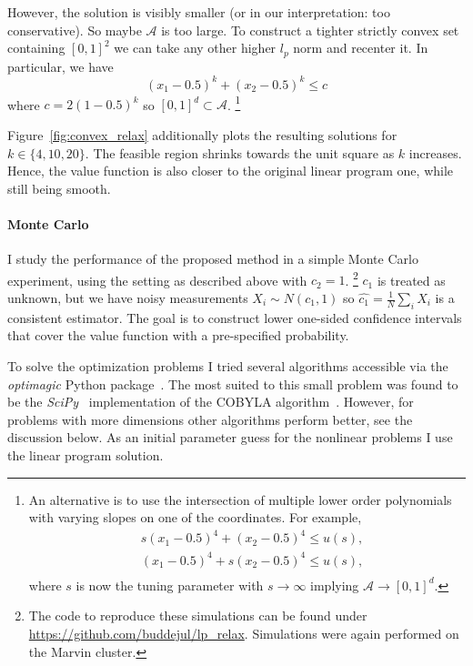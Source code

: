 \documentclass[12pt,a4paper,english]{article} %
\numberwithin{equation}{section}
\theoremstyle{definition}
\theoremstyle{remark}
\theoremstyle{plain}
\begin{document}
However, the solution is visibly smaller (or in our interpretation: too conservative).
So maybe $\mathcal{A}$ is too large.
To construct a tighter strictly convex set containing $[0,1]^2$ we can take any other higher $l_p$ norm and recenter it.
In particular, we have
\begin{equation*}
	(x_1-0.5)^k + (x_2-0.5)^k \leq c
\end{equation*}
where $c = 2(1-0.5)^k$ so $[0,1]^d \subset \mathcal{A}$.
\footnote{An alternative is to use the intersection of multiple lower order polynomials with varying slopes on one of the coordinates. For example,
\begin{align}
	& s(x_1 - 0.5)^4 + (x_2 - 0.5)^4 \leq u(s), \\
	& (x_1 - 0.5)^4 + s(x_2 - 0.5)^4 \leq u(s), \\
\end{align}
where $s$ is now the tuning parameter with $s\to\infty$ implying $\mathcal{A} \to [0,1]^d$.}

Figure~\ref{fig:convex_relax} additionally plots the resulting solutions for $k\in\{4, 10, 20\}$.
The feasible region shrinks towards the unit square as $k$ increases.
Hence, the value function is also closer to the original linear program one, while still being smooth.

\paragraph{Monte Carlo}
I study the performance of the proposed method in a simple Monte Carlo experiment, using the setting as described above with $c_2=1$.
\footnote{The code to reproduce these simulations can be found under \url{https://github.com/buddejul/lp_relax}.
Simulations were again performed on the Marvin cluster.}
$c_1$ is treated as unknown, but we have noisy measurements $X_i \sim N(c_1, 1)$ so $\hat{c_1} = \frac{1}{N}\sum_i X_i$ is a consistent estimator.
The goal is to construct lower one-sided confidence intervals that cover the value function with a pre-specified probability.

To solve the optimization problems I tried several algorithms accessible via the \textit{optimagic} Python package~\citep{Gabler2024}.
The most suited to this small problem was found to be the \textit{SciPy}~\citep{scipy} implementation of the COBYLA algorithm~\citep{cobyla_powell1994direct}.
However, for problems with more dimensions other algorithms perform better, see the discussion below.
As an initial parameter guess for the nonlinear problems I use the linear program solution.
\end{document}

